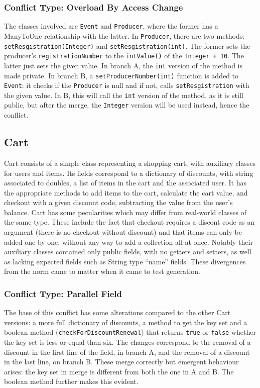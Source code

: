 \subsubsection{Conflict Type: Overload By Access Change}

The classes involved are \texttt{Event} and \texttt{Producer}, where the former has a ManyToOne relationship with the latter.
In \texttt{Producer}, there are two methods: \texttt{setResgistration(Integer)} and \texttt{setResgistration(int)}. The former sets
the producer's \texttt{registrationNumber} to the \texttt{intValue()} of the \texttt{Integer + 10}. The latter just sets the given value.
In branch A, the \texttt{int} version of the method is made private. In branch B, a \texttt{setProducerNumber(int)} function is added
to \texttt{Event}: it checks if the \texttt{Producer} is null and if not, calls \texttt{setResgistration} with the given value. In B, this will
call the \texttt{int} version of the method, as it is still public, but after the merge, the \texttt{Integer} version will be used instead,
hence the conflict.

\subsection{Cart}

Cart consists of a simple class representing a shopping cart, with auxiliary classes for users and items.
Its fields correspond to a dictionary of discounts, with string associated to doubles, a list of items in the cart
and the associated user.
It has the appropriate methods to add items to the cart, calculate the cart value, and checkout with a given discount code,
subtracting the value from the user's balance.
Cart has some pecularities which may differ from real-world classes of the same type. These include the fact that checkout
requires a discont code as an argument (there is no checkout without discount) and that items can only be added one by one, without
any way to add a collection all at once.  Notably their auxiliary classes contained only public fields, with no getters and setters, as
well as lacking expected fields such as String type ``name'' fields. These divergences from the norm came to matter when it came to
test generation.

\subsubsection{Conflict Type: Parallel Field}

The base of this conflict has some alterations compared to the other Cart versions: a more full dictionary of discounts,
a method to get the key set and a boolean method (\texttt{checkForDiscountRenewal}) that returns \texttt{true} or \texttt{false} whether the key set is less or equal than six.
The changes correspond to the removal of a discount in the first line of the field, in branch A, and the removal of a discount in the last line, on branch B.
These merge correctly but emergent behaviour arises: the key set in merge is different from both the one in A and B.
The boolean method further makes this evident.


